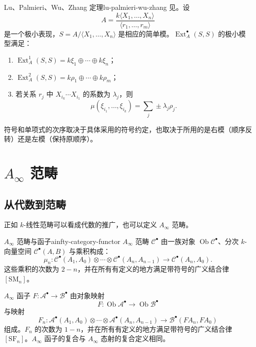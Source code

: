 \begin{theorem}{Lu、Palmieri、Wu、Zhang 定理}{lu-palmieri-wu-zhang}
见。设
\[
  A=\frac{k\langle X_1,\ldots,X_n\rangle}
  {\langle r_1,\ldots,r_m\rangle}
\]
是一个极小表现，$S=A/\langle X_1,\ldots,X_n\rangle$ 是相应的简单模。$\operatorname{Ext}_A^\bullet(S,S)$ 的极小模型满足：
\begin{enumerate}
  \item $\operatorname{Ext}_A^1(S,S)=k\xi_1\oplus\cdots\oplus k\xi_n$；
  \item $\operatorname{Ext}_A^2(S,S)=k\rho_1\oplus\cdots\oplus k\rho_m$；
  \item 若关系 $r_j$ 中 $X_{i_k}\cdots X_{i_1}$ 的系数为 $\lambda_j$，则
  \[
    \mu(\xi_{i_1},\ldots,\xi_{i_k})
    =\sum_j\pm\lambda_j\rho_j.
  \]
\end{enumerate}
\end{theorem}

\begin{note}
符号和单项式的次序取决于具体采用的符号约定，也取决于所用的是右模（顺序反转）还是左模（保持原顺序）。
\end{note}

\section{\texorpdfstring{$A_\infty$}{A-infinity} 范畴}\label{sec:ainfty-categories}
\subsection{从代数到范畴}\label{subsec:algebras-to-categories}
正如 $k$-线性范畴可以看成代数的推广，也可以定义 $A_\infty$ 范畴。

\begin{definition}{$A_\infty$ 范畴与函子}{ainfty-category-functor}
$A_\infty$ 范畴 $\mathcal C^\bullet$ 由一族对象 $\operatorname{Ob}\mathcal C^\bullet$、分次 $k$-向量空间 $\mathcal C^\bullet(A,B)$ 与乘积构成：
\[
  \mu_n\colon
  \mathcal C^\bullet(A_1,A_0)\otimes\cdots\otimes
  \mathcal C^\bullet(A_n,A_{n-1})
  \longrightarrow\mathcal C^\bullet(A_n,A_0).
\]
这些乘积的次数为 $2-n$，并在所有有定义的地方满足带符号的广义结合律 $[\mathrm{SM}_n]$。

$A_\infty$ 函子 $F\colon\mathcal A^\bullet\to\mathcal B^\bullet$ 由对象映射
\[
  F\colon\operatorname{Ob}\mathcal A^\bullet\to
  \operatorname{Ob}\mathcal B^\bullet
\]
与映射
\[
  F_n\colon
  \mathcal A^\bullet(A_1,A_0)\otimes\cdots\otimes
  \mathcal A^\bullet(A_n,A_{n-1})
  \longrightarrow\mathcal B^\bullet(FA_n,FA_0)
\]
组成。$F_n$ 的次数为 $1-n$，并在所有有定义的地方满足带符号的广义结合律 $[\mathrm{SF}_n]$。$A_\infty$ 函子的复合与 $A_\infty$ 态射的复合定义相同。
\end{definition}

